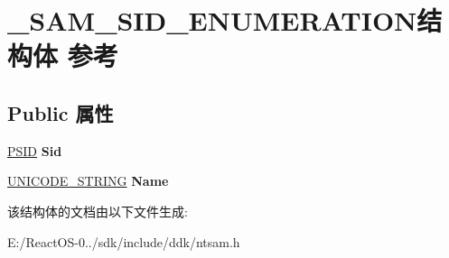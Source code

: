 \hypertarget{struct___s_a_m___s_i_d___e_n_u_m_e_r_a_t_i_o_n}{}\section{\+\_\+\+S\+A\+M\+\_\+\+S\+I\+D\+\_\+\+E\+N\+U\+M\+E\+R\+A\+T\+I\+O\+N结构体 参考}
\label{struct___s_a_m___s_i_d___e_n_u_m_e_r_a_t_i_o_n}
\subsection*{Public 属性}
\begin{DoxyCompactItemize}
\item 
\mbox{\label{struct___s_a_m___s_i_d___e_n_u_m_e_r_a_t_i_o_n_a2a7f694dc88e30549b3313653323eb07}} 
\hyperlink{struct___s_i_d}{P\+S\+ID} {\bfseries Sid}
\item 
\mbox{\label{struct___s_a_m___s_i_d___e_n_u_m_e_r_a_t_i_o_n_a06c946373b9868dd4dc43ed4865f95f0}} 
\hyperlink{struct___u_n_i_c_o_d_e___s_t_r_i_n_g}{U\+N\+I\+C\+O\+D\+E\+\_\+\+S\+T\+R\+I\+NG} {\bfseries Name}
\end{DoxyCompactItemize}


该结构体的文档由以下文件生成\+:\begin{DoxyCompactItemize}
\item 
E\+:/\+React\+O\+S-\/0../sdk/include/ddk/ntsam.\+h\end{DoxyCompactItemize}
